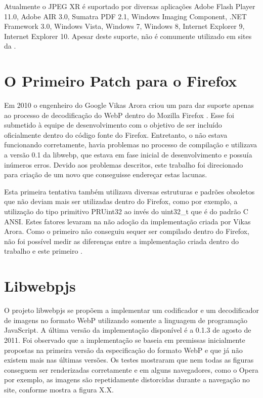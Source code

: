 \documentclass[espaco=simples,appendix=Name]{abnt}
\begin{document}
Atualmente o JPEG XR é suportado por diversas aplicações Adobe Flash Player 11.0, Adobe AIR 3.0, Sumatra PDF 2.1, Windows Imaging Component, .NET Framework 3.0, Windows Vista, Windows 7, Windows 8, Internet Explorer 9, Internet Explorer 10. Apesar deste suporte, não é comumente utilizado em sites da . \cite{HDPhoto}

\section{O Primeiro Patch para o Firefox}

Em 2010 o engenheiro do Google Vikas Arora criou um  para dar suporte apenas ao processo de decodificação do WebP dentro do Mozilla Firefox \cite{FirefoxBug}. Esse  foi submetido à equipe de desenvolvimento com o objetivo de ser incluído oficialmente dentro do código fonte do Firefox. Entretanto, o  não estava funcionando corretamente, havia problemas no processo de compilação e utilizava a versão 0.1 da libwebp, que estava em fase inicial de desenvolvimento e possuía inúmeros erros. Devido aos problemas descritos, este trabalho foi direcionado para criação de um novo  que conseguisse endereçar estas lacunas.

Esta primeira tentativa também utilizava diversas estruturas e padrões obsoletos que não deviam mais ser utilizadas dentro do Firefox, como por exemplo, a utilização do tipo primitivo PRUint32 ao invés do uint32\_t que é do padrão C ANSI. Estes fatores levaram na não adoção da implementação criada por Vikas Arora. Como o primeiro  não conseguiu sequer ser compilado dentro do Firefox, não foi possível medir as diferenças entre a implementação criada dentro do trabalho e este primeiro .

\section{Libwebpjs}

O projeto libwebpjs \cite{libwebpjs} se propõem a implementar um codificador e um decodificador de imagens no formato WebP utilizando somente a linguagem de programação JavaScript. A última versão da implementação disponível é a 0.1.3 de agosto de 2011. Foi observado que a implementação se baseia em premissas inicialmente propostas na primeira versão da especificação do formato WebP e que já não existem mais nas últimas versões. Os testes mostraram que nem todas as figuras conseguem ser renderizadas corretamente e em alguns navegadores, como o Opera por exemplo, as imagens são repetidamente distorcidas durante a navegação no site, conforme mostra a figura X.X.
\end{document}
